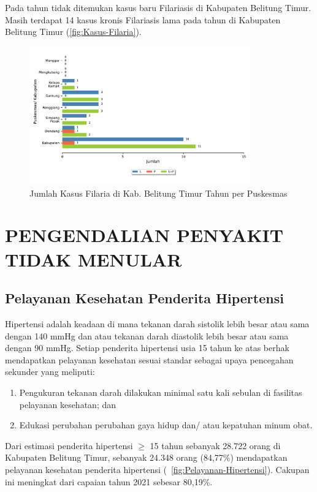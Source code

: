 Pada tahun \tP tidak ditemukan kasus baru Filariasis di Kabupaten Belitung Timur.
Masih terdapat 14 kasus kronis Filariasis lama pada tahun \tP di Kabupaten Belitung Timur (\autoref{fig:Kasus-Filaria}).

\begin{figure}[H]
  \centering
  \includegraphics[width=0.85\textwidth]{bab_06/bab_06_12_kasusFilaria}
  \caption{Jumlah Kasus Filaria di Kab. Belitung Timur Tahun \tP per Puskesmas}
  \label{fig:Kasus-Filaria}
\end{figure}

\section[PENGENDALIAN PTM]{PENGENDALIAN PENYAKIT TIDAK MENULAR}
\subsection{Pelayanan Kesehatan Penderita Hipertensi}
Hipertensi adalah keadaan di mana tekanan darah sistolik lebih besar atau sama dengan 140 mmHg dan atau tekanan darah diastolik lebih besar atau sama dengan 90 mmHg.
Setiap penderita hipertensi usia 15 tahun ke atas berhak mendapatkan pelayanan kesehatan sesuai standar sebagai upaya pencegahan sekunder yang meliputi:
\begin{enumerate}
  \item Pengukuran tekanan darah dilakukan minimal satu kali sebulan di fasilitas pelayanan kesehatan; dan
  \item Edukasi perubahan perubahan gaya hidup dan/ atau kepatuhan minum obat.
\end{enumerate}

Dari estimasi penderita hipertensi $\geq$ 15 tahun sebanyak 28.722 orang di Kabupaten Belitung Timur, sebanyak 24.348 orang (84,77\%) mendapatkan pelayanan kesehatan penderita hipertensi (~\autoref{fig:Pelayanan-Hipertensi}).
Cakupan ini meningkat dari capaian tahun 2021 sebesar 80,19\%.

